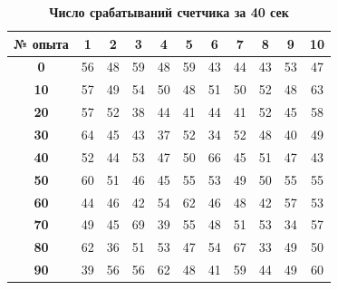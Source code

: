 \documentclass[a4paper, 12pt]{article}
\begin{document}
\begin{table}
\caption{\textbf{Число срабатываний счетчика за 40 сек}}
\begin{tabular}{|c|c|c|c|c|c|c|c|c|c|c|}
\hline 
\textbf{№ опыта} & \textbf{1} & \textbf{2} & \textbf{3} & \textbf{4} & \textbf{5} & \textbf{6} & \textbf{7} & \textbf{8} & \textbf{9} & \textbf{10} \\ 
\hline 
\textbf{0} & 56 & 48 & 59 & 48 & 59 & 43 & 44 & 43 & 53 & 47 \\ 
\hline 
\textbf{10} & 57 & 49 & 54 & 50 & 48 & 51 & 50 & 52 & 48 & 63 \\ 
\hline\hline 
\textbf{20} & 57 & 52 & 38 & 44 & 41 & 44 & 41 & 52 & 45 & 58 \\ 
\hline 
\textbf{30} & 64 & 45 & 43 & 37 & 52 & 34 & 52 & 48 & 40 & 49 \\ 
\hline\hline
\textbf{40} & 52 & 44 & 53 & 47 & 50 & 66 & 45 & 51 & 47 & 43 \\ 
\hline 
\textbf{50} & 60 & 51 & 46 & 45 & 55 & 53 & 49 & 50 & 55 & 55 \\ 
\hline\hline 
\textbf{60} & 44 & 46 & 42 & 54 & 62 & 46 & 48 & 42 & 57 & 53 \\ 
\hline 
\textbf{70} & 49 & 45 & 69 & 39 & 55 & 48 & 51 & 53 & 34 & 57 \\ 
\hline\hline 
\textbf{80} & 62 & 36 & 51 & 53 & 47 & 54 & 67 & 33 & 49 & 50 \\ 
\hline 
\textbf{90} & 39 & 56 & 56 & 62 & 48 & 41 & 59 & 44 & 49 & 60 \\ 
\hline 
\end{tabular} 
\end{table}
\end{document}
